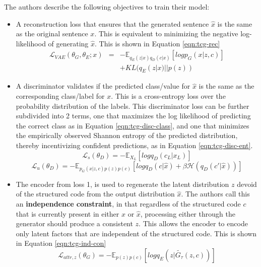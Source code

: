 The authors describe the following objectives to train their model:
\begin{itemize}
	\item A reconstruction loss that ensures that the generated sentence $\hat{x}$ is the same as the original sentence $x$. This is equivalent to minimizing the negative log-likelihood of generating $\hat{x}$. This is shown in Equation \ref{eqn:tcg-rec}
	      \begin{eqnarray} \label{eqn:tcg-rec}
		      \mathcal{L}_{VAE}(\theta_G, \theta_E; x) &=& \nonumber
		      - \mathbb{E}_{q_E(z|x)q_D(c|x)}[log p_G(x|z,c)] \\ & &
		      + KL(q_E(z|x)||p(z))
	      \end{eqnarray}
	\item A discriminator validates if the predicted class/value for $\hat{x}$ is the same as the corresponding class/label for $x$. This is a cross-entropy loss over the probability distribution of the labels. This discriminator loss can be further subdivided into 2 terms, one that maximizes the log likelihood of predicting the correct class as in Equation \ref{eqn:tcg-disc-class}, and one that minimizes the empirically observed Shannon entropy of the predicted distribution, thereby incentivizing confident predictions, as in Equation \ref{eqn:tcg-disc-ent}.
	      \begin{equation} \label{eqn:tcg-disc-class}
		      \mathcal{L}_s(\theta_D) = - \mathbb{E}_{X_L}[log q_D(c_L|x_L)]
	      \end{equation}
	      \begin{equation} \label{eqn:tcg-disc-ent}
		      \mathcal{L}_u(\theta_D) = - \mathbb{E}_{p_G(\hat{x}|z,c)p(z)p(c)}
		      [log q_D(c|\hat{x}) + \beta \mathcal{H}(q_D(c'|\hat{x}))]
	      \end{equation}
	\item The encoder from loss 1, is used to regenerate the latent distribution $z$ devoid of the structured code from the output distribution $\hat{x}$. The authors call this an \textbf{independence constraint}, in that regardless of the structured code $c$ that is currently present in either $x$ or $\hat{x}$, processing either through the generator should produce a consistent $z$. This allows the encoder to encode only latent factors that are independent of the structured code. This is shown in Equation \ref{eqn:tcg-ind-con}
	      \begin{equation} \label{eqn:tcg-ind-con}
		      \mathcal{L}_{attr, z}(\theta_G) = - \mathbb{E}_{p(z)p(c)}
		      [log q_E(z|\tilde{G_{\tau}}(z,c))]
	      \end{equation}
\end{itemize}

